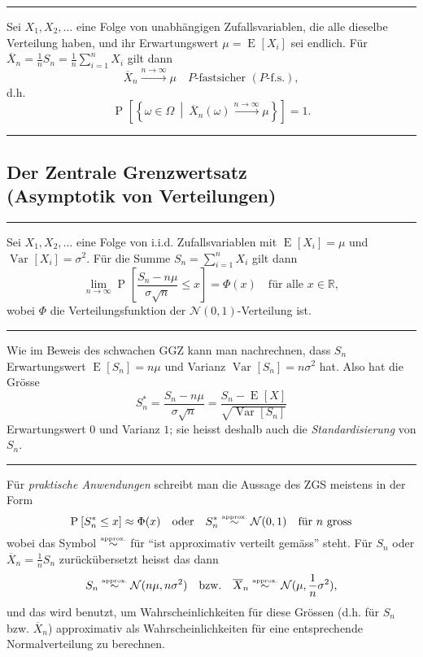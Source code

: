 \documentclass[a4paper, 12pt]{extarticle}
\newcommand{\sep}{\vspace{5pt}\noindent\hrule\vspace{5pt}}
\newcommand{\R}{\mathbb{R}}
\newcommand{\cN}{\mathcal{N}}
\newcommand{\dset}[2]{\left\{ #1 \ \middle| \ #2 \right\}}
\newcommand{\Prob}[2][]{\operatorname{P}_{#1}\left[ #2 \right]}
\newcommand{\Var}[2][]{\operatorname{Var}_{#1}\left[ #2 \right]}
\newcommand{\Exp}[2][]{\operatorname{E}_{#1}\left[ #2 \right]}
\newcommand{\approxsim}{\stackrel{\text{\tiny approx.}}{\sim}}
\begin{document}
\begin{multicols*}{2}
\sep

 Sei $X_1,X_2,\ldots$ eine Folge von
unabhängigen Zufallsvariablen, die alle dieselbe Verteilung haben, und ihr
Erwartungswert $\mu = \Exp{X_i}$ sei endlich. Für
$\overline{X}_n=\frac{1}{n}S_n=\frac{1}{n}\sum_{i=1}^n X_i$ gilt dann
\[
\overline{X}_n \xrightarrow{n \to \infty} \mu
\quad
P\text{-fastsicher }(P\text{-f.s.}),
\]
d.h.
\[
\Prob{\dset{\omega\in\Omega}{\overline{X}_n(\omega)
\xrightarrow{n \to \infty}\mu}}=1.
\]

\sep

\subsection{Der Zentrale Grenzwertsatz\\ \small(Asymptotik von Verteilungen)}

\sep


Sei $X_1,X_2,\ldots$ eine Folge von i.i.d. Zufallsvariablen mit $\Exp{X_i}=\mu$
und $\Var{X_i}=\sigma^2$. Für die Summe $S_n=\sum_{i=1}^n X_i$ gilt dann
\[
\lim_{n\to\infty}\Prob{\frac{S_n-n\mu}{\sigma\sqrt{n}}\leq x}=\Phi(x)
\quad
\text{für alle }x\in\R,
\]
wobei $\Phi$ die Verteilungsfunktion der $\cN(0,1)$-Verteilung ist.

\sep

\Com Wie im Beweis des schwachen GGZ kann man nachrechnen, dass $S_n$
Erwartungswert $\Exp{S_n}=n\mu$ und Varianz $\Var{S_n}=n\sigma^2$ hat. Also hat
die Grösse
\[
S^*_n = \frac{S_n-n\mu}{\sigma\sqrt{n}} = \frac{S_n-\Exp{X}}{\sqrt{\Var{S_n}}}
\]
Erwartungswert $0$ und Varianz $1$; sie heisst deshalb auch die
\emph{Standardisierung} von $S_n$.

\sep

 Für
\emph{praktische Anwendungen} schreibt man die Aussage des ZGS meistens in der Form
\[
\Prob{S^*_n\leq x} \approx \Phi(x) 
\ \ \ \text{oder} \ \ \
S^*_n\approxsim \cN(0,1)
\ \ \ \text{für }n\text{ gross}
\]
wobei das Symbol $\approxsim$ für ``ist approximativ
verteilt gemäss'' steht. Für $S_n$ oder $\overline{X}_n=\frac{1}{n}S_n$
zurückübersetzt heisst das dann
\[
S_n \approxsim \cN(n\mu,n\sigma^2)
\quad\text{bzw.}\quad
\overline{X}_n \approxsim \cN(\mu,\frac{1}{n}\sigma^2),
\]
und das wird benutzt, um Wahrscheinlichkeiten für diese Grössen (d.h. für $S_n$
bzw. $\overline{X}_n$) approximativ als Wahrscheinlichkeiten für eine
entsprechende Normalverteilung zu berechnen.


\end{multicols*}
\end{document}
